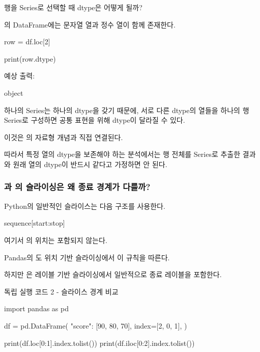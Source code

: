 \begin{dhknote}
\begin{dhksmry}[centered]
행을 Series로 선택할 때 dtype은 어떻게 될까?
\end{dhksmry}
\end{dhknote}

의 DataFrame에는 문자열 열과 정수 열이 함께 존재한다.

\begin{dhkcode}
row = df.loc[2]

print(row.dtype)
\end{dhkcode}

예상 출력:

\begin{dhkzsh}
object
\end{dhkzsh}

하나의 Series는 하나의 dtype을 갖기 때문에, 서로 다른 dtype의 열들을 하나의 행 Series로 구성하면 공통 표현을 위해 dtype이 달라질 수 있다.

이것은 의 자료형 개념과 직접 연결된다.

따라서 특정 열의 dtype을 보존해야 하는 분석에서는 행 전체를 Series로 추출한 결과와 원래 열의 dtype이 반드시 같다고 가정하면 안 된다.

\subsubsection{과 의 슬라이싱은 왜 종료 경계가 다를까?}

Python의 일반적인 슬라이스는 다음 구조를 사용한다.

\begin{dhkcode}
sequence[start:stop]
\end{dhkcode}

여기서 의 위치는 포함되지 않는다.

Pandas의 도 위치 기반 슬라이싱에서 이 규칙을 따른다.

하지만 은 레이블 기반 슬라이싱에서 일반적으로 종료 레이블을 포함한다.

\begin{dhknote}
\begin{dhksmry}[centered]
독립 실행 코드 2 - 슬라이스 경계 비교
\end{dhksmry}
\end{dhknote}

\begin{dhkcode}
import pandas as pd

df = pd.DataFrame(
    {"score": [90, 80, 70]},
    index=[2, 0, 1],
)

print(df.loc[0:1].index.tolist())
print(df.iloc[0:2].index.tolist())
\end{dhkcode}

